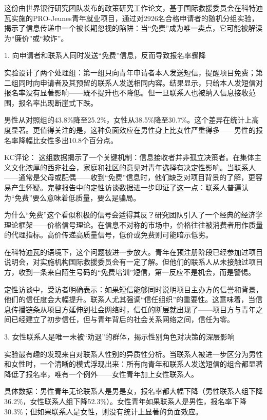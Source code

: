 \documentclass[11pt]{ctexart}
\begin{document}
这份由世界银行研究团队发布的政策研究工作论文，基于国际救援委员会在科特迪瓦实施的PRO-Jeunes青年就业项目，通过对2926名合格申请者的随机分组实验，揭示了信息传递中一个被长期忽视的陷阱：当“免费”成为唯一卖点，它可能被解读为“廉价”或“欺诈”。

1. 向申请者和联系人同时发送“免费”信息，反而导致报名率骤降

实验设计了两个处理组：第一组只向青年申请者本人发送短信，提醒项目免费；第二组同时向申请者及其预留的联系人发送相同内容。结果显示，只给本人发短信对报名率没有显著影响——既不提升也不降低。但一旦联系人也被纳入信息接收范围，报名率出现断崖式下跌。

男性从对照组的43.8\%降至25.2\%，女性从38.5\%降至30.7\%。这个差异在统计上高度显著。更值得关注的是，这种负面效应在男性身上比女性严重得多——男性的报名率降幅比女性多出10.8个百分点。

KC评论： 这组数据揭示了一个关键机制：信息接收者并非孤立决策者。在集体主义文化浓厚的西非社会，家庭和社区的意见对青年选择有决定性影响。当联系人——通常是父母或配偶——收到“免费”信息时，他们缺乏对项目背景的了解，更容易产生怀疑。完整报告中的定性访谈数据进一步印证了这一点：联系人普遍认为“免费”要么意味着低质量，要么是骗局。

为什么“免费”这个看似积极的信号会适得其反？研究团队引入了一个经典的经济学理论框架——价格信号理论。在信息不对称的市场中，价格往往被消费者用作质量的代理指标。高价传递高质量信号，低价或免费则可能暗示低劣。

在科特迪瓦的语境下，这个问题被进一步放大。青年在预注册阶段已经参加过项目说明会，对实施机构国际救援委员会有一定了解。但他们的联系人从未接触过项目方，收到一条来自陌生号码的“免费培训”短信，第一反应不是机会，而是警惕。

定性访谈中，受访者明确表示：如果短信能够同时说明项目主办方的信誉和背景，他们的信任度会大幅提升。联系人尤其强调“信任组织”的重要性。这意味着，当信息传播链条从项目方延伸到社会网络时，信任的断层就出现了——项目方与青年之间已经建立了初步信任，但与青年背后的社会关系网络之间，信任为零。

3. 女性联系人是唯一未被“劝退”的群体，揭示性别角色对决策的深层影响

实验最有趣的发现来自对联系人性别的异质性分析。当联系人被进一步区分为男性和女性时，一个清晰的模式浮现出来：所有向青年和联系人发送短信的组合都显著降低了报名率，唯有一个例外——女性青年加上女性联系人。

具体数据：男性青年无论联系人是男是女，报名率都大幅下降（男性联系人组下降36.2\%，女性联系人组下降52.3\%）。女性青年如果联系人是男性，报名率下降30.3\%；但如果联系人是女性，则没有统计上显著的负面效应。
\end{document}

